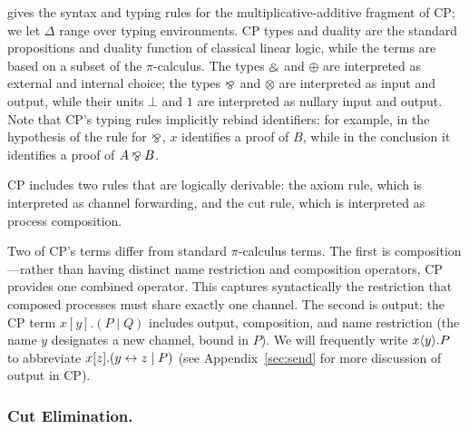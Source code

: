 \documentclass[oribibl,orivec,envcountsame]{llncs}
\begin{document}
 gives the syntax and typing rules for the multiplicative-additive fragment of CP;
we let $\Delta$ range over typing environments.  CP types and duality are the standard propositions
and duality function of classical linear logic, while the terms are based on a subset of the
$\pi$-calculus.  The types $\mathbin\binampersand$ and $\oplus$ are interpreted as external and internal choice; the
types $\mathbin\bindnasrepma$ and $\otimes$ are interpreted as input and output, while their units $\bot$ and $1$
are interpreted as nullary input and output.  Note that CP's typing rules implicitly rebind
identifiers: for example, in the hypothesis of the rule for $\mathbin\bindnasrepma$, $x$ identifies a proof of $B$,
while in the conclusion it identifies a proof of $A \mathbin\bindnasrepma B$.

CP includes two rules that are logically derivable: the axiom rule, which is interpreted as channel
forwarding, and the cut rule, which is interpreted as process composition.

Two of CP's terms differ from standard $\pi$-calculus terms.  The first is
com\-pos\-i\-tion---rather than having distinct name restriction and composition operators, CP
provides one combined operator.  This captures syntactically the restriction that composed processes
must share exactly one channel.  The second is output: the CP term $x[y].(P \mid Q)$ includes
output, composition, and name restriction (the name $y$ designates a new channel, bound in $P$).  We
will frequently write $x\langle y\rangle.P$ to abbreviate $x[z].(y \leftrightarrow z \mid P)$ (see
Appendix~\ref{sec:send} for more discussion of output in CP).

\subsubsection{Cut Elimination.}
\end{document}
